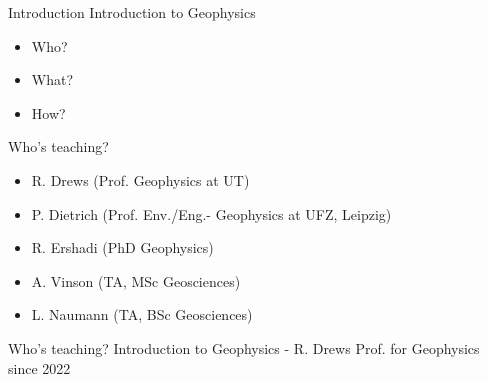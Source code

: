 
\begin{frame}
\end{frame}

\begin{frame}
  \begin{PointSix}{Introduction}
    \small
    \alert{Introduction to Geophysics}
    \begin{itemize}
      \item Who?
      \item What?
      \item How?
    \end{itemize}
  \end{PointSix}
  \end{frame}

\begin{frame}
    \begin{PointSix}{Who's teaching?}
        \small
        \begin{itemize}
            \item R. Drews (Prof. Geophysics at UT)
            \item P. Dietrich (Prof. Env./Eng.- Geophysics at UFZ, Leipzig)
            \item R. Ershadi (PhD Geophysics)
            \item A. Vinson (TA, MSc Geosciences)
            \item L. Naumann (TA, BSc Geosciences)
          \end{itemize}
    \end{PointSix}
\end{frame}

\begin{frame}
    \begin{PointSix}{Who's teaching?}
        \alert{Introduction to Geophysics - R. Drews}
        \small Prof. for Geophysics since 2022
      \end{PointSix}
\end{frame}

